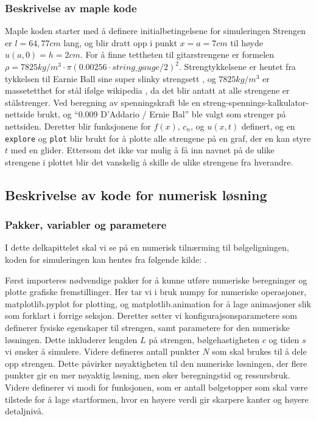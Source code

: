 \subsubsection{Beskrivelse av maple kode}

Maple koden starter med å definere initialbetingelsene for simuleringen Strengen er $l = 64,77cm$ lang, og blir dratt
opp i punkt $x = a = 7cm$ til høyde $u(a,0) = h = 2cm$. For å finne tettheten til gitarstrengene er 
formelen $\rho = 7825 kg/m^3 \cdot \pi (0.00256 \cdot string\_gauge /2)^2$. Strengtykkelsene er hentet fra tykkelsen til
Earnie Ball sine super slinky strengsett \parencite{ErnieBallSlinky}, og $7825 kg/m^3$ er massetetthet 
for stål ifølge wikipedia \parencite{WikipediaTetthet}, da det blir antatt at alle strengene 
er stålstrenger. Ved beregning av spenningskraft ble en streng-spennings-kalkulator-nettside 
\parencite{RodrigoStringTensionCalc} brukt, og ``0.009 D'Addario / Ernie Bal''  ble valgt som strenger på 
nettsiden. Deretter blir funksjonene for $f(x)$, $c_n$, og $u(x,t)$ definert, og en \verb|explore| og
\verb|plot| blir brukt for å plotte alle strengene på en graf, der en kan styre $t$ med en glider.
Ettersom det ikke var mulig å få inn navnet på de ulike strengene i plottet blir det vanskelig å 
skille de ulike strengene fra hverandre.

\subsection{Beskrivelse av kode for numerisk løsning}
\subsubsection{Pakker, variabler og parametere}
I dette delkapittelet skal vi se på en numerisk tilnærming til bølgeligningen, koden for simuleringen kan hentes fra 
følgende kilde: \parencite{simuleringKode}. 

Først importeres nødvendige pakker for å kunne utføre numeriske beregninger og plotte grafiske fremstillinger. Her
tar vi i bruk numpy for numeriske operasjoner, matplotlib.pyplot for plotting, og matplotlib.animation for å lage 
animasjoner slik som forklart i forrige seksjon. Deretter setter vi konfigurajsonsparametere som definerer
fysiske egenskaper til strengen, samt parametere for den numeriske løsningen. Dette inkluderer lengden $L$ på strengen,
bølgehastigheten $c$ og tiden $s$ vi ønsker å simulere. Videre defineres antall punkter $N$ som skal brukes til å dele 
opp strengen. Dette påvirker nøyaktigheten til den numeriske løsningen, der flere punkter gir en mer nøyaktig løsning,
men øker beregningstid og ressursbruk. Videre definerer vi modi for funksjonen, som er antall bølgetopper som skal være 
tilstede for å lage startformen, hvor en høyere verdi gir skarpere kanter og høyere detaljnivå. 

